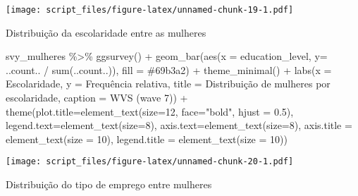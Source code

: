 \documentclass[
]{article}
\newenvironment{Shaded}{\begin{snugshade}}{\end{snugshade}}
\newcommand{\AttributeTok}[1]{\textcolor[rgb]{0.77,0.63,0.00}{#1}}
\newcommand{\DecValTok}[1]{\textcolor[rgb]{0.00,0.00,0.81}{#1}}
\newcommand{\FloatTok}[1]{\textcolor[rgb]{0.00,0.00,0.81}{#1}}
\newcommand{\FunctionTok}[1]{\textcolor[rgb]{0.00,0.00,0.00}{#1}}
\newcommand{\NormalTok}[1]{#1}
\newcommand{\SpecialCharTok}[1]{\textcolor[rgb]{0.00,0.00,0.00}{#1}}
\newcommand{\StringTok}[1]{\textcolor[rgb]{0.31,0.60,0.02}{#1}}
\begin{document}
\texttt{[image: script\_files/figure-latex/unnamed-chunk-19-1.pdf]}

Distribuição da escolaridade entre as mulheres

\begin{Shaded}
\begin{Highlighting}[]
\NormalTok{svy\_mulheres }\SpecialCharTok{\%\textgreater{}\%}
  \FunctionTok{ggsurvey}\NormalTok{() }\SpecialCharTok{+}
  \FunctionTok{geom\_bar}\NormalTok{(}\FunctionTok{aes}\NormalTok{(}\AttributeTok{x =}\NormalTok{ education\_level, }\AttributeTok{y=}\NormalTok{ ..count.. }\SpecialCharTok{/} \FunctionTok{sum}\NormalTok{(..count..)), }\AttributeTok{fill =} \StringTok{\textquotesingle{}\#69b3a2\textquotesingle{}}\NormalTok{) }\SpecialCharTok{+}
  \FunctionTok{theme\_minimal}\NormalTok{() }\SpecialCharTok{+}
  \FunctionTok{labs}\NormalTok{(}\AttributeTok{x =} \StringTok{\textquotesingle{}Escolaridade\textquotesingle{}}\NormalTok{,}
       \AttributeTok{y =} \StringTok{\textquotesingle{}Frequência relativa\textquotesingle{}}\NormalTok{,}
       \AttributeTok{title =} \StringTok{\textquotesingle{}Distribuição de mulheres por escolaridade\textquotesingle{}}\NormalTok{,}
       \AttributeTok{caption =} \StringTok{\textquotesingle{}WVS (wave 7)\textquotesingle{}}\NormalTok{) }\SpecialCharTok{+}
  \FunctionTok{theme}\NormalTok{(}\AttributeTok{plot.title=}\FunctionTok{element\_text}\NormalTok{(}\AttributeTok{size=}\DecValTok{12}\NormalTok{, }\AttributeTok{face=}\StringTok{"bold"}\NormalTok{, }\AttributeTok{hjust =} \FloatTok{0.5}\NormalTok{),}
        \AttributeTok{legend.text=}\FunctionTok{element\_text}\NormalTok{(}\AttributeTok{size=}\DecValTok{8}\NormalTok{),}
        \AttributeTok{axis.text=}\FunctionTok{element\_text}\NormalTok{(}\AttributeTok{size=}\DecValTok{8}\NormalTok{),}
        \AttributeTok{axis.title =} \FunctionTok{element\_text}\NormalTok{(}\AttributeTok{size =} \DecValTok{10}\NormalTok{),}
        \AttributeTok{legend.title =} \FunctionTok{element\_text}\NormalTok{(}\AttributeTok{size =} \DecValTok{10}\NormalTok{))}
\end{Highlighting}
\end{Shaded}

\texttt{[image: script\_files/figure-latex/unnamed-chunk-20-1.pdf]}

Distribuição do tipo de emprego entre mulheres
\end{document}
